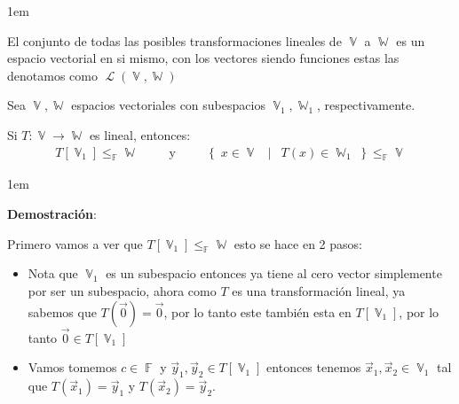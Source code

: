 \documentclass[12pt, fleqn]{report}                             %
\newenvironment{SmallIndentation}[1][0.75em]                    %
        {\begin{adjustwidth}{#1}{}\begin{footnotesize}}             %
        {\end{footnotesize}\end{adjustwidth}}                       %
\DeclareMathOperator \Space {\quad}                             %
\DeclareMathOperator \MiniSpace {\;}                            %
\newcommand \Such {\MiniSpace | \MiniSpace}                     %
\newcommand \Also {\MiniSpace \text{y} \MiniSpace}              %
\theoremstyle{break}                                            %
\DeclareMathOperator \GenericField {\mathbb{F}}                 %
\DeclareMathOperator \VectorSet    {\mathbb{V}}                 %
\DeclareMathOperator \SubVectorSet {\mathbb{W}}                 %
\DeclareMathOperator \LinTrans {\mathcal{T}}                    %
\DeclareMathOperator \Laplace {\mathcal{L}}                     %
\newcommand{\Set}[1]    {\left\{ \; #1 \; \right\}}             %
\begin{document}
\begin{itemize}
\begin{SmallIndentation}[1em]
                        \item
                            El conjunto de todas las posibles transformaciones lineales de $\VectorSet$
                            a $\SubVectorSet$ es un espacio vectorial en si mismo, con los vectores
                            siendo funciones estas las denotamos como $\Laplace(\VectorSet, \SubVectorSet)$
                        
                        \end{SmallIndentation}

                    \item
                        Sea $\VectorSet, \SubVectorSet$ espacios vectoriales con subespacios 
                        $\VectorSet_1, \SubVectorSet_1$, respectivamente. 

                        Si $T : \VectorSet \to \SubVectorSet$ es lineal, entonces:
                        \begin{align*}
                            T[\VectorSet_1] \leq_{\GenericField} \SubVectorSet
                            \Space \Also \Space     
                            \Set{x \in \VectorSet \Such T(x) \in \SubVectorSet_1} \leq_{\GenericField} \VectorSet   
                        \end{align*} 

                        \begin{SmallIndentation}[1em]
                            \textbf{Demostración}:
                            
                            Primero vamos a ver que $T[\VectorSet_1] \leq_{\GenericField} \SubVectorSet$
                            esto se hace en 2 pasos:
                            \begin{itemize}
                                \item 
                                    Nota que $\VectorSet_1$ es un subespacio entonces ya tiene al cero
                                    vector simplemente por ser un subespacio, ahora como $T$ es una transformación
                                    lineal, ya sabemos que $T(\vec 0) = \vec 0$, por lo tanto este también 
                                    esta en $T[\VectorSet_1]$, por lo tanto $\vec 0 \in T[\VectorSet_1]$

                                \item
                                    Vamos tomemos $c \in \GenericField$ y $\vec y_1, \vec y_2 \in T[\VectorSet_1]$
                                    entonces tenemos $\vec x_1, \vec x_2 \in \VectorSet_1$ tal que 
                                    $T(\vec x_1) = \vec y_1$ y $T(\vec x_2) = \vec y_2$.


\end{itemize}
\end{SmallIndentation}
\end{itemize}
\end{document}
